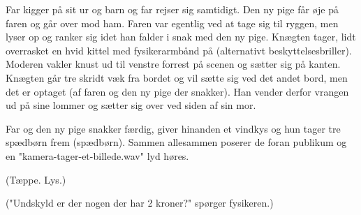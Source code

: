 \documentclass[a4paper,11pt]{article}
\begin{document}
\begin{sketch}
{Far kigger på sit ur og barn og far rejser sig samtidigt. Den ny pige får øje på faren og går over mod ham. Faren var egentlig ved at tage sig til ryggen, men lyser op og ranker sig idet han falder i snak med den ny pige. Knægten tager, lidt overrasket en hvid kittel med fysikerarmbånd på (alternativt beskyttelsesbriller). Moderen vakler knust ud til venstre forrest på scenen og sætter sig på kanten. Knægten går tre skridt væk fra bordet og vil sætte sig ved det andet bord, men det er optaget (af faren og den ny pige der snakker). Han vender derfor vrangen ud på sine lommer og sætter sig over ved siden af sin mor.

Far og den ny pige snakker færdig, giver hinanden et vindkys og hun tager tre spædbørn frem (spædbørn). Sammen allesammen poserer de foran publikum og en "kamera-tager-et-billede.wav" lyd høres.


(Tæppe. Lys.)


("Undskyld er der nogen der har 2 kroner?" spørger fysikeren.)
} 



\end{sketch}
\end{document}
